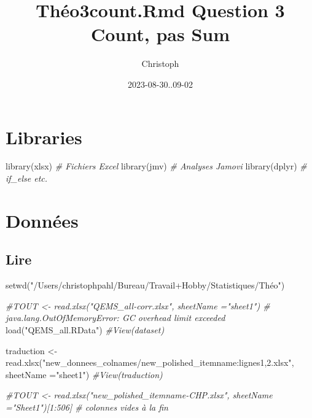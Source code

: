 \documentclass[
]{article}
\title{Théo3count.Rmd Question 3 Count, pas Sum}
\author{Christoph}
\date{2023-08-30..09-02}
\newenvironment{Shaded}{\begin{snugshade}}{\end{snugshade}}
\newcommand{\AttributeTok}[1]{\textcolor[rgb]{0.77,0.63,0.00}{#1}}
\newcommand{\CommentTok}[1]{\textcolor[rgb]{0.56,0.35,0.01}{\textit{#1}}}
\newcommand{\FunctionTok}[1]{\textcolor[rgb]{0.00,0.00,0.00}{#1}}
\newcommand{\NormalTok}[1]{#1}
\newcommand{\OtherTok}[1]{\textcolor[rgb]{0.56,0.35,0.01}{#1}}
\newcommand{\StringTok}[1]{\textcolor[rgb]{0.31,0.60,0.02}{#1}}
\begin{document}
\maketitle

\hypertarget{libraries}{%
\section{Libraries}\label{libraries}}

\begin{Shaded}
\begin{Highlighting}[]
\FunctionTok{library}\NormalTok{(xlsx)                                         }\CommentTok{\# Fichiers Excel}
\FunctionTok{library}\NormalTok{(jmv)                                          }\CommentTok{\# Analyses Jamovi}
\FunctionTok{library}\NormalTok{(dplyr)                                        }\CommentTok{\# if\_else etc.}
\end{Highlighting}
\end{Shaded}

\hypertarget{donnuxe9es}{%
\section{Données}\label{donnuxe9es}}

\hypertarget{lire}{%
\subsection{Lire}\label{lire}}

\begin{Shaded}
\begin{Highlighting}[]
\FunctionTok{setwd}\NormalTok{(}\StringTok{"/Users/christophpahl/Bureau/Travail+Hobby/Statistiques/Théo"}\NormalTok{)}

\CommentTok{\#TOUT \textless{}{-} read.xlsx("QEMS\_all{-}corr.xlsx", sheetName ="sheet1")  \# java.lang.OutOfMemoryError: GC overhead limit exceeded}
\FunctionTok{load}\NormalTok{(}\StringTok{"QEMS\_all.RData"}\NormalTok{)}
\CommentTok{\#View(dataset)}

\NormalTok{traduction }\OtherTok{\textless{}{-}} \FunctionTok{read.xlsx}\NormalTok{(}\StringTok{"new\_donnees\_colnames/new\_polished\_itemname:lignes1,2.xlsx"}\NormalTok{, }\AttributeTok{sheetName =}\StringTok{"sheet1"}\NormalTok{)}
\CommentTok{\#View(traduction)}

\CommentTok{\#TOUT \textless{}{-} read.xlsx("new\_polished\_itemname{-}CHP.xlsx", sheetName ="Sheet1")[1:506]  \# colonnes vides à la fin}
\end{Highlighting}
\end{Shaded}
\end{document}
